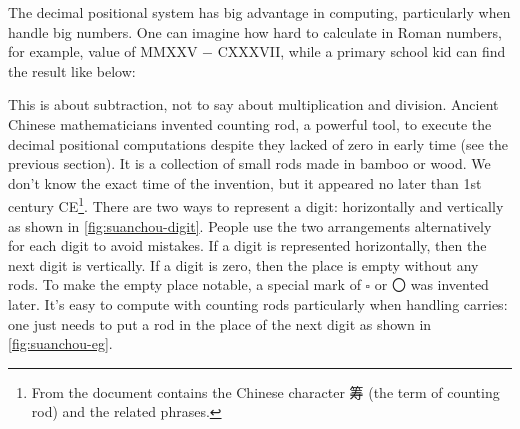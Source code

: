 \documentclass[b5paper]{article}
\begin{document}
The decimal positional system has big advantage in computing, particularly when handle big numbers. One can imagine how hard to calculate in Roman numbers, for example, value of MMXXV $-$ CXXXVII, while a primary school kid can find the result like below:

\begin{center}
\end{center}

\label{sec:counting-rods} 
This is about subtraction, not to say about multiplication and division. Ancient Chinese mathematicians invented counting rod, a powerful tool, to execute the decimal positional computations despite they lacked of zero in early time (see the previous section). It is a collection of small rods made in bamboo or wood. We don't know the exact time of the invention, but it appeared no later than 1st century CE\footnote{From the document contains the Chinese character 筹 (the term of counting rod) and the related phrases.}. There are two ways to represent a digit: horizontally and vertically as shown in \cref{fig:suanchou-digit}. People use the two arrangements alternatively for each digit to avoid mistakes. If a digit is represented horizontally, then the next digit is vertically. If a digit is zero, then the place is empty without any rods. To make the empty place notable, a special mark of $\square$ or 〇 was invented later. It's easy to compute with counting rods particularly when handling carries: one just needs to put a rod in the place of the next digit as shown in \cref{fig:suanchou-eg}.
\end{document}
